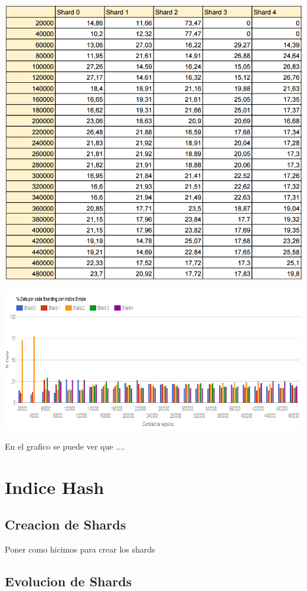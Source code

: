 \documentclass[a4paper, 10pt, twoside]{article}
\begin{document}
\begin{center}
\includegraphics[scale=0.8]{resultado_indice_simple.png}
\end{center}
\includegraphics[scale=0.5]{indice_simple.png}

En el grafico se puede ver que ....
\section{Indice Hash}

\subsection{Creacion de Shards}

Poner como hicimos para crear los shards

\subsection{Evolucion de Shards}
\end{document}

